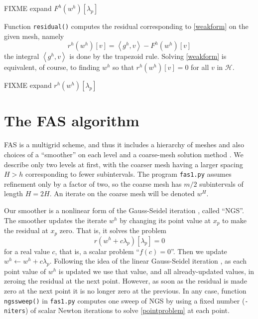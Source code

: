 \documentclass[letterpaper,final,12pt,reqno]{amsart}
\newcommand{\ip}[2]{\left<#1,#2\right>}
\begin{document}
FIXME expand $F^h(w^h)[\lambda_p]$

Function \texttt{residual()} computes the residual corresponding to \eqref{weakform} on the given mesh, namely
\begin{equation}
  r^h(w^h)[v] = \ip{g^h}{v} - F^h(w^h)[v]  \label{residual}
\end{equation}
the integral $\ip{g^h}{v}$ is done by the trapezoid rule.  Solving \eqref{weakform} is equivalent, of course, to finding $w^h$ so that $r^h(w^h)[v]=0$ for all $v$ in $\mathcal{H}$.

FIXME expand $r^h(w^h)[\lambda_p]$


\section{The FAS algorithm}

FAS is a multigrid scheme, and thus it includes a hierarchy of meshes and also choices of a ``smoother'' on each level and a coarse-mesh solution method \cite{Briggsetal2000}.  We describe only two levels at first, with the coarser mesh having a larger spacing $H>h$ corresponding to fewer subintervals.  The program \texttt{fas1.py} assumes refinement only by a factor of two, so the coarse mesh has $m/2$ subintervals of length $H=2H$.  An iterate on the coarse mesh will be denoted $w^H$.

Our smoother is a nonlinear form of the Gauss-Seidel iteration \cite{Briggsetal2000}, called ``NGS''.  The smoother updates the iterate $w^h$ by changing its point value at $x_p$ to make the residual at $x_p$ zero.  That is, it solves the problem
\begin{equation}
r(w^h + c \lambda_p)[\lambda_p] = 0  \label{pointproblem}
\end{equation}
for a real value $c$, that is, a scalar problem ``$f(c)=0$''.  Then we update $w^h \longleftarrow w^h + c \lambda_p$.  Following the idea of the linear Gauss-Seidel iteration \cite{Bueler2021}, as each point value of $w^h$ is updated we use that value, and all already-updated values, in zeroing the residual at the next point.  However, as soon as the residual is made zero at the next point it is no longer zero at the previous.  In any case, function \texttt{ngssweep()} in \texttt{fas1.py} computes one sweep of NGS by using a fixed number (\texttt{-niters}) of scalar Newton iterations to solve \eqref{pointproblem} at each point.
\end{document}
